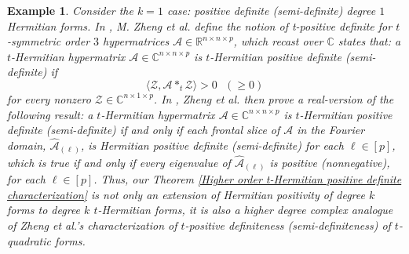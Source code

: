\documentclass[11pt]{article}
\newtheorem{example}[theorem]{Example}
\begin{document}
\begin{example}
    Consider the $k=1$ case: positive definite (semi-definite) degree $1$ Hermitian forms. In \cite{zheng2021t}, M. Zheng et al. define the notion of t-positive definite for $t$-symmetric order $3$ hypermatrices $\mathcal{A}\in \mathbb{R}^{n\times n\times p}$, which recast over $\mathbb{C}$ states that: a $t$-Hermitian hypermatrix $\mathcal{A}\in \mathbb{C}^{n\times n\times p}$ is $t$-Hermitian positive definite (semi-definite) if 
    \[\langle \mathcal{Z}, \mathcal{A}*_t \mathcal{Z}\rangle > 0\text{ }(\geq 0)\]
    for every nonzero $\mathcal{Z}\in \mathbb{C}^{n\times 1\times p}$. In \cite[Theorem 4.4]{zheng2021t}, Zheng et al. then prove a real-version of the following result: a $t$-Hermitian hypermatrix $\mathcal{A}\in \mathbb{C}^{n\times n\times p}$ is $t$-Hermitian positive definite (semi-definite) if and only if each frontal slice of $\mathcal{A}$ in the Fourier domain, $\widehat{\mathcal{A}}_{(\ell)}$, is Hermitian positive definite (semi-definite) for each $\ell\in [p]$, which is true if and only if every eigenvalue of $\widehat{\mathcal{A}}_{(\ell)}$ is positive (nonnegative), for each $\ell\in [p]$. Thus, our Theorem \ref{Higher order t-Hermitian positive definite characterization} is not only an extension of Hermitian positivity of degree $k$ forms to degree $k$ $t$-Hermitian forms, it is also a higher degree complex analogue of Zheng et al.'s characterization of $t$-positive definiteness (semi-definiteness) of $t$-quadratic forms. 
    

\end{example}
\end{document}
